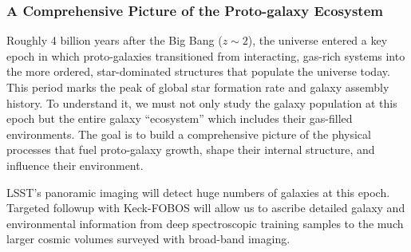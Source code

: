 \documentclass[oneside,11pt]{amsart}
\newcommand{\comment}[2][todo]{{\color{#1}[[{\bf #2}]]}}
\begin{document}



\subsubsection{A Comprehensive Picture of the Proto-galaxy Ecosystem}
\label{sec:galaxies}
\noindent \comment{1 page}

Roughly 4 billion years after the Big Bang ($z \sim 2$), the universe
entered a key epoch in which proto-galaxies transitioned from
interacting, gas-rich systems into the more ordered, star-dominated
structures that populate the universe today.  This period marks the peak
of global star formation rate and galaxy assembly history.   To
understand it, we must not only study the galaxy population at this
epoch but the entire galaxy ``ecosystem'' which includes their
gas-filled environments.  The goal is to build a comprehensive picture
of the physical processes that fuel proto-galaxy growth, shape their
internal structure, and influence their environment.

LSST's panoramic imaging will detect huge numbers of galaxies at this
epoch.  Targeted followup with Keck-FOBOS will allow us to ascribe
detailed galaxy and environmental information from deep spectroscopic
training samples to the much larger cosmic volumes surveyed with
broad-band imaging.
\end{document}
